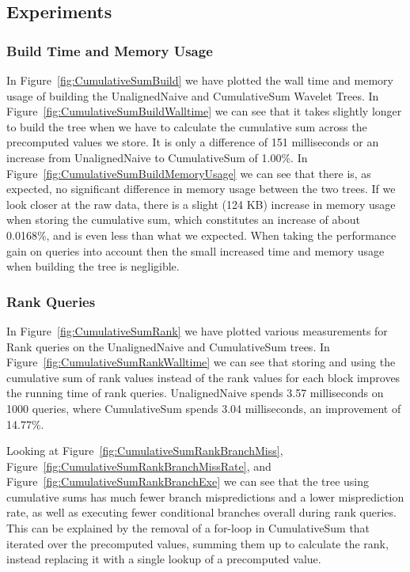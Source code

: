 \subsection{Experiments}

\subsubsection{Build Time and Memory Usage}
In Figure~\ref{fig:CumulativeSumBuild} we have plotted the wall time and memory usage of building the UnalignedNaive and CumulativeSum Wavelet Trees.
In Figure~\ref{fig:CumulativeSumBuildWalltime} we can see that it takes slightly longer to build the tree when we have to calculate the cumulative sum across the precomputed values we store.
It is only a difference of 151 milliseconds or an increase from UnalignedNaive to CumulativeSum of 1.00\%.
In Figure~\ref{fig:CumulativeSumBuildMemoryUsage} we can see that there is, as expected, no significant difference in memory usage between the two trees.
If we look closer at the raw data, there is a slight (124 KB) increase in memory usage when storing the cumulative sum, which constitutes an increase of about 0.0168\%, and is even less than what we expected.
When taking the performance gain on queries into account then the small increased time and memory usage when building the tree is negligible.

\subsubsection{Rank Queries}
In Figure~\ref{fig:CumulativeSumRank} we have plotted various measurements for Rank queries on the UnalignedNaive and CumulativeSum trees.
In Figure~\ref{fig:CumulativeSumRankWalltime} we can see that storing and using the cumulative sum of rank values instead of the rank values for each block improves the running time of rank queries.
UnalignedNaive spends 3.57 milliseconds on 1000 queries, where CumulativeSum spends 3.04 milliseconds, an improvement of 14.77\%.

Looking at Figure~\ref{fig:CumulativeSumRankBranchMiss}, Figure~\ref{fig:CumulativeSumRankBranchMissRate}, and Figure~\ref{fig:CumulativeSumRankBranchExe} we can see that the tree using cumulative sums has much fewer branch mispredictions and a lower misprediction rate, as well as executing fewer conditional branches overall during rank queries.
This can be explained by the removal of a for-loop in CumulativeSum that iterated over the precomputed values, summing them up to calculate the rank, instead replacing it with a single lookup of a precomputed value.

